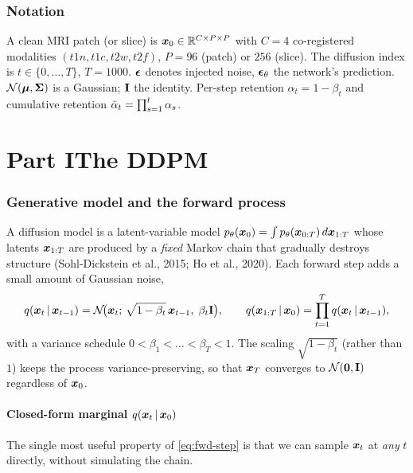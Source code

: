 \section*{Notation}
A clean MRI patch (or slice) is $\bm{x}_0\in\mathbb{R}^{C\times P\times P}$ with $C=4$ co-registered
modalities $(t1n,t1c,t2w,t2f)$, $P=96$ (patch) or $256$ (slice). The diffusion
index is $t\in\{0,\dots,T\}$, $T=1000$. $\bm{\epsilon}$ denotes injected noise, $\bm{\epsilon}_\theta$
the network's prediction. $\mathcal{N}(\bm\mu,\bm\Sigma)$ is a Gaussian; $\mathbf{I}$ the identity.
Per-step retention $\alpha_t=1-\beta_t$ and cumulative retention
$\bar{\alpha}_t=\prod_{s=1}^{t}\alpha_s$.

\part*{Part I\quad The DDPM}
\label{part:ddpm}

\section{Generative model and the forward process}
A diffusion model is a latent-variable model
$p_\theta(\bm{x}_0)=\int p_\theta(\bm{x}_{0:T})\,d\bm{x}_{1:T}$ whose latents $\bm{x}_{1:T}$ are
produced by a \emph{fixed} Markov chain that gradually destroys structure
(Sohl-Dickstein et al., 2015; Ho et al., 2020). Each forward step adds a small
amount of Gaussian noise,
\begin{equation}
q(\bm{x}_t\,\vert\, \bm{x}_{t-1}) = \mathcal{N}\!\big(\bm{x}_t;\, \sqrt{1-\beta_t}\,\bm{x}_{t-1},\; \beta_t \mathbf{I}\big),
\qquad
q(\bm{x}_{1:T}\,\vert\,\bm{x}_0)=\prod_{t=1}^{T} q(\bm{x}_t\,\vert\,\bm{x}_{t-1}),
\label{eq:fwd-step}
\end{equation}
with a variance schedule $0<\beta_1<\dots<\beta_T<1$. The scaling $\sqrt{1-\beta_t}$
(rather than $1$) keeps the process variance-preserving, so that $\bm{x}_T$ converges
to $\mathcal{N}(\bm 0,\mathbf{I})$ regardless of $\bm{x}_0$.

\subsection{Closed-form marginal \texorpdfstring{$q(\bm{x}_t\,\vert\,\bm{x}_0)$}{q(x\_t | x\_0)}}
The single most useful property of \eqref{eq:fwd-step} is that we can sample
$\bm{x}_t$ at \emph{any} $t$ directly, without simulating the chain.


